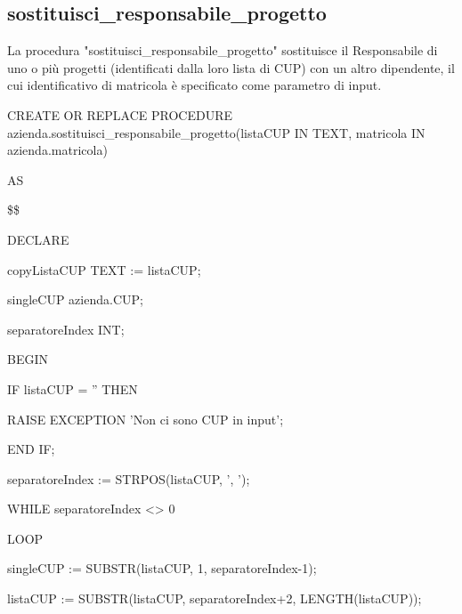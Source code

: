         \subsection{sostituisci\_responsabile\_progetto}
        La procedura "sostituisci\_responsabile\_progetto" sostituisce il Responsabile di uno o più progetti (identificati dalla loro lista di CUP) con un altro dipendente, il cui identificativo di matricola è specificato come parametro di input. 
        \ttfamily
            \begin{flushleft}
                \begin{description}
                    \item CREATE OR REPLACE PROCEDURE azienda.sostituisci\_responsabile\_progetto(listaCUP IN TEXT, matricola IN azienda.matricola)   
                    \item AS
                    \item \$\$
                    \item DECLARE
                    \begin{description}
                        \item copyListaCUP TEXT := listaCUP;
                        \item singleCUP azienda.CUP;
                        \item separatoreIndex INT;
                    \end{description}
                    \item BEGIN 
                    \begin{description}
                        \item IF listaCUP = '' THEN
                        \begin{description}
                            \item RAISE EXCEPTION 'Non ci sono CUP in input';
                        \end{description}
                        \item END IF;
                        \item separatoreIndex := STRPOS(listaCUP, ', ');
                        
                        \vspace{0.5cm}

                        \item WHILE separatoreIndex <> 0
                        \item LOOP
                        \begin{description}
                            \item singleCUP := SUBSTR(listaCUP, 1, separatoreIndex-1);
                            \item listaCUP := SUBSTR(listaCUP, separatoreIndex+2, LENGTH(listaCUP));
                            

\end{description}
\end{description}
\end{description}
\end{flushleft}
